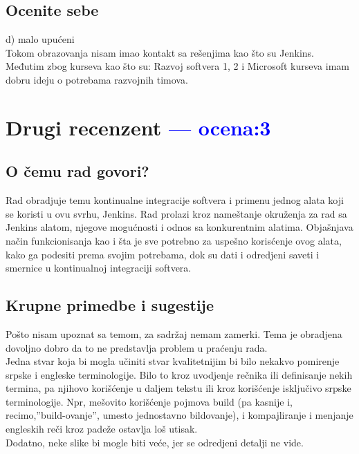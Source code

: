 \documentclass[a4paper]{report}
\newcommand{\odgovor}[1]{\textcolor{blue}{#1}}
\begin{document}
\section{Ocenite sebe}
d) malo upućeni \\
Tokom obrazovanja nisam imao kontakt sa rešenjima kao što su Jenkins.
Međutim zbog kurseva kao što su: Razvoj softvera 1, 2 i Microsoft kurseva imam 
dobru ideju o potrebama razvojnih timova.


\chapter{Drugi recenzent \odgovor{--- ocena:3} }
\section{O čemu rad govori?}
Rad obradjuje temu kontinualne integracije softvera i primenu jednog alata koji se koristi u ovu svrhu, Jenkins. Rad prolazi kroz nameštanje okruženja za rad sa Jenkins alatom, njegove mogućnosti i odnos sa konkurentnim alatima. Objašnjava način funkcionisanja kao i šta je sve potrebno za uspešno korisćenje ovog alata, kako ga podesiti prema svojim potrebama, dok su dati i odredjeni saveti i smernice u kontinualnoj integraciji softvera.

\section{Krupne primedbe i sugestije}
Pošto nisam upoznat sa temom, za sadržaj nemam zamerki. Tema je obradjena dovoljno dobro da to ne predstavlja problem u praćenju rada.\\
Jedna stvar koja bi mogla učiniti stvar kvalitetnijim bi bilo nekakvo pomirenje srpske i engleske terminologije. Bilo to kroz uvodjenje rečnika ili definisanje nekih termina, pa njihovo korišćenje u daljem tekstu ili kroz korišćenje isključivo srpske terminologije. Npr, mešovito korišćenje pojmova build (pa kasnije i, recimo,''build-ovanje'', umesto jednostavno bildovanje), i kompajliranje i menjanje engleskih reči kroz padeže ostavlja loš utisak. \\
Dodatno, neke slike bi mogle biti veće, jer se odredjeni detalji ne vide.\\
\end{document}
